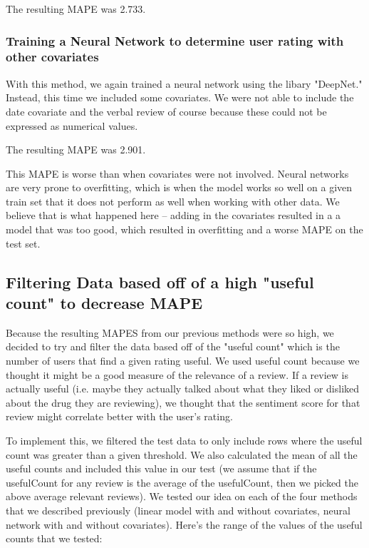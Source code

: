 \documentclass{article}
\begin{document}
The resulting MAPE was 2.733.

\subsubsection{Training a Neural Network to determine user rating with other covariates}

With this method, we again trained a neural network using the libary "DeepNet." Instead, this time we included some covariates. We were not able to include the date covariate and the verbal review of course because these could not be expressed as numerical values. 

The resulting MAPE was 2.901.

This MAPE is worse than when covariates were not involved. Neural networks are very prone to overfitting, which is when the model works so well on a given train set that it does not perform as well when working with other data. We believe that is what happened here -- adding in the covariates resulted in a a model that was too good, which resulted in overfitting and a worse MAPE on the test set.


\subsection{Filtering Data based off of a high "useful count" to decrease MAPE}

Because the resulting MAPES from our previous methods were so high, we decided to try and filter the data based off of the "useful count" which is the number of users that find a given rating useful. We used useful count because we thought it might be a good measure of the relevance of a review. If a review is actually useful (i.e. maybe they actually talked about what they liked or disliked about the drug they are reviewing), we thought that the sentiment score for that review might correlate better with the user's rating.

To implement this, we filtered the test data to only include rows where the useful count was greater than a given threshold. We also calculated the mean of all the useful counts and included this value in our test (we assume that if the usefulCount for any review is the average of the usefulCount, then we picked the above average relevant reviews). We tested our idea on each of the four methods that we described previously (linear model with and without covariates, neural network with and without covariates). Here's the range of the values of the useful counts that we tested:
\end{document}
